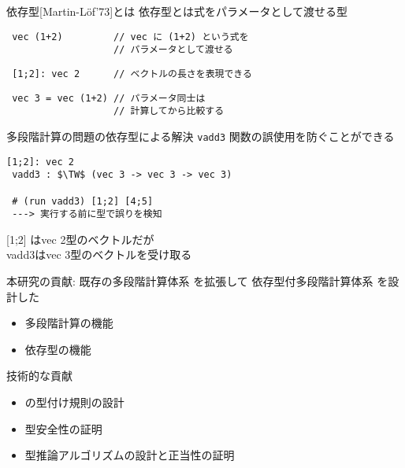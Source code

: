 \documentclass[dvipdfmx,aspectratio=169, 20pt]{beamer}
\renewcommand{\V}{\vdash}
\begin{document}
\begin{frame}[fragile]{依存型[Martin-L{\"o}f'73]とは}
    \renewcommand{\V}{\text{vec}\ }
    依存型とは式をパラメータとして渡せる型
    \begin{exampleblock}{}
        \begin{Verbatim}
 vec (1+2)         // vec に (1+2) という式を
                   // パラメータとして渡せる
 \end{Verbatim}
    \end{exampleblock}
    \begin{exampleblock}{}
        \begin{Verbatim}
 [1;2]: vec 2      // ベクトルの長さを表現できる
        \end{Verbatim}
    \end{exampleblock}
    \begin{exampleblock}{}
        \begin{Verbatim}
 vec 3 = vec (1+2) // パラメータ同士は
                   // 計算してから比較する
        \end{Verbatim}
    \end{exampleblock}
\end{frame}


\begin{frame}[fragile]{多段階計算の問題の依存型による解決}
    \renewcommand{\V}{\text{vec}\ }
    {\verb|vadd3|} 関数の誤使用を防ぐことができる
    \begin{exampleblock}{}
        \begin{Verbatim}[commandchars=\\\{\},codes={\catcode`$=3\catcode`^=7}]
 [1;2]: vec 2
 vadd3 : $\TW$ (vec 3 -> vec 3 -> vec 3)

 # (run vadd3) [1;2] [4;5]
 ---> 実行する前に型で誤りを検知
 \end{Verbatim}
    \end{exampleblock}
 [1;2] はvec 2型のベクトルだが\\
 vadd3はvec 3型のベクトルを受け取る
\end{frame}

\begin{frame}[fragile]{本研究の貢献: \LMD}
    既存の多段階計算体系  を拡張して
    依存型付多段階計算体系 \LMD を設計した
    \begin{itemize}
        \item 多段階計算の機能
        \item 依存型の機能
    \end{itemize}
    技術的な貢献
    \begin{itemize}
        \item \LMD の型付け規則の設計
        \item 型安全性の証明
        \item 型推論アルゴリズムの設計と正当性の証明
    \end{itemize}
\end{frame}
\end{document}
